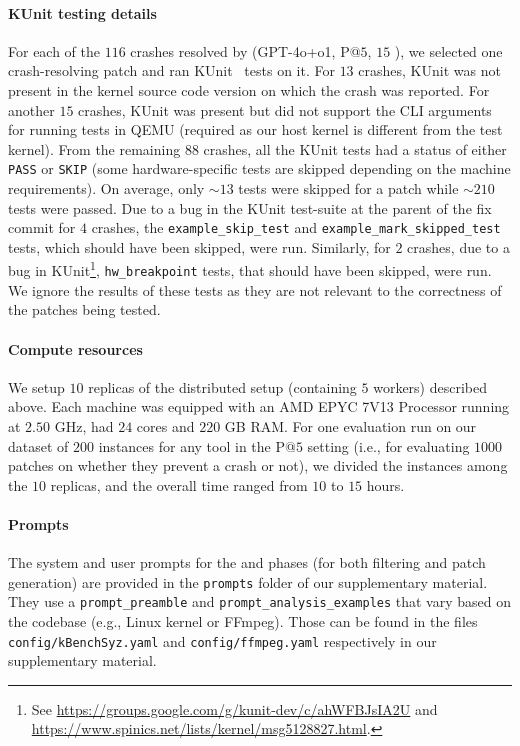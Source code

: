 \paragraph{KUnit testing details}
For each of the $116$ crashes resolved by \cresearcher{} (GPT-4o+o1, P@$5$, $15$ \maxcalls{}), we selected one crash-resolving patch and ran KUnit~\citep{kunit} tests on it.
For $13$ crashes, KUnit was not present in the kernel source code version on which the crash was reported.
For another $15$ crashes, KUnit was present but did not support the CLI arguments for running tests in QEMU (required as our host kernel is different from the test kernel).
From the remaining $88$ crashes, all the KUnit tests had a status of either \texttt{PASS} or \texttt{SKIP} (some hardware-specific tests are skipped depending on the machine requirements).
On average, only $\sim 13$ tests were skipped for a patch while $\sim 210$ tests were passed.
Due to a bug in the KUnit test-suite at the parent of the fix commit for $4$ crashes, the \texttt{example\_skip\_test} and \texttt{example\_mark\_skipped\_test} tests, which should have been skipped, were run.
Similarly, for $2$ crashes, due to a bug in KUnit\footnote{See \url{https://groups.google.com/g/kunit-dev/c/ahWFBJsIA2U} and \url{https://www.spinics.net/lists/kernel/msg5128827.html}.}, \texttt{hw\_breakpoint} tests, that should have been skipped, were run.
We ignore the results of these tests as they are not relevant to the correctness of the patches being tested.

\paragraph{Compute resources}
We setup $10$ replicas of the distributed setup (containing $5$ workers) described above.
Each machine was equipped with an AMD EPYC 7V13 Processor running at $2.50$ GHz, had $24$ cores and $220$ GB RAM.
For one evaluation run on our dataset of $200$ instances for any tool in the P@$5$ setting (i.e., for evaluating $1000$ patches on whether they prevent a crash or not), we divided the instances among the $10$ replicas, and the overall time ranged from $10$ to $15$ hours.

\paragraph{\cresearcher{} Prompts}
The system and user prompts for the \analysisphase{} and \synthesisphase{} phases (for both filtering and patch generation) are provided in the \texttt{prompts} folder of our supplementary material. They use a \texttt{prompt\_preamble} and \texttt{prompt\_analysis\_examples} that vary based on the codebase (e.g., Linux kernel or FFmpeg). Those can be found in the files \texttt{config/kBenchSyz.yaml} and \texttt{config/ffmpeg.yaml} respectively in our supplementary material.

